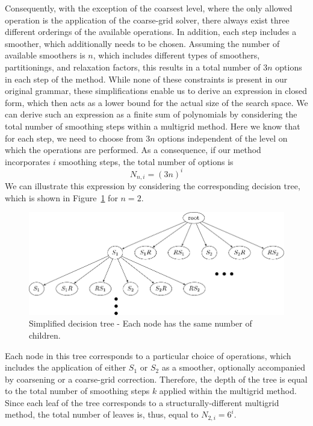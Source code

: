 Consequently, with the exception of the coarsest level, where the only allowed operation is the application of the coarse-grid solver, there always exist three different orderings of the available operations.
In addition, each step includes a smoother, which additionally needs to be chosen.
Assuming the number of available smoothers is $n$, which includes different types of smoothers, partitionings, and relaxation factors, this results in a total number of $3 n$ options in each step of the method.
While none of these constraints is present in our original grammar, these simplifications enable us to derive an expression in closed form, which then acts as a lower bound for the actual size of the search space.
We can derive such an expression as a finite sum of polynomials by considering the total number of smoothing steps within a multigrid method.
Here we know that for each step, we need to choose from $3 n$ options independent of the level on which the operations are performed.
As a consequence, if our method incorporates $i$ smoothing steps, the total number of options is 
\begin{equation}\tag{4.9}
	N_{n,i} = (3 n)^i
	\label{eq:simplified-number-of-options}
\end{equation}
We can illustrate this expression by considering the corresponding decision tree, which is shown in Figure~\ref{fig:decision-tree} for $n = 2$.
\begin{figure}
	\centering
	\includegraphics[width=\textwidth]{figures/trees/decision_tree_annotated.pdf}
	\caption{Simplified decision tree - Each node has the same number of children.}
	\label{fig:decision-tree}
\end{figure}
Each node in this tree corresponds to a particular choice of operations, which includes the application of either $S_1$ or $S_2$ as a smoother, optionally accompanied by coarsening or a coarse-grid correction.
Therefore, the depth of the tree is equal to the total number of smoothing steps $k$ applied within the multigrid method.
Since each leaf of the tree corresponds to a structurally-different multigrid method, the total number of leaves is, thus, equal to $N_{2,i} = 6^i$.
